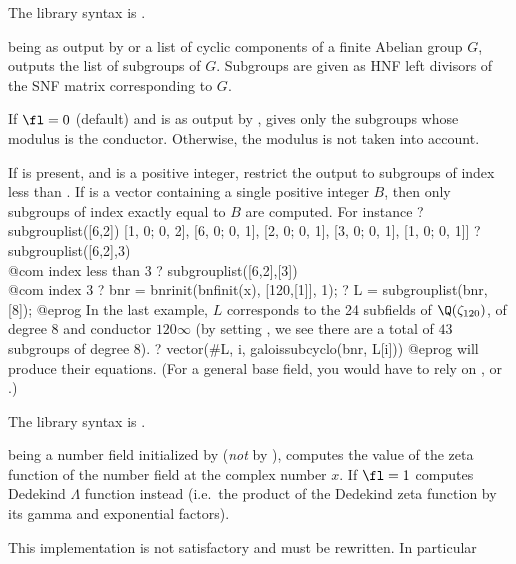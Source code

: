 The library syntax is .

\label{se:subgrouplist}
 being as output by  or a list of cyclic components
of a finite Abelian group $G$, outputs the list of subgroups of $G$. Subgroups
are given as HNF left divisors of the SNF matrix corresponding to $G$.

If $\fl=0$ (default) and  is as output by , gives
only the subgroups whose modulus is the conductor. Otherwise, the modulus is
not taken into account.

If  is present, and is a positive integer, restrict the output to
subgroups of index less than . If  is a vector
containing a single positive integer $B$, then only subgroups of index
exactly equal to $B$ are computed. For instance
\bprog
? subgrouplist([6,2])
[1, 0; 0, 2], [6, 0; 0, 1], [2, 0; 0, 1], [3, 0; 0, 1], [1, 0; 0, 1]]
? subgrouplist([6,2],3)    \\@com index less than 3
? subgrouplist([6,2],[3])  \\@com index 3
? bnr = bnrinit(bnfinit(x), [120,[1]], 1);
? L = subgrouplist(bnr, [8]);
@eprog\noindent
In the last example, $L$ corresponds to the 24 subfields of
$\Q(\zeta_{120})$, of degree $8$ and conductor $120\infty$ (by setting \fl,
we see there are a total of $43$ subgroups of degree $8$).
\bprog
? vector(#L, i, galoissubcyclo(bnr, L[i]))
@eprog\noindent
will produce their equations. (For a general base field, you would
have to rely on , or .)

The library syntax is .

\label{se:zetak}
 being a number
field initialized by  (\emph{not} by ),
computes the value of the  zeta function of the number
field at the complex number $x$. If $\fl=1$ computes Dedekind $\Lambda$
function instead (i.e.~the product of the Dedekind zeta function by its gamma
and exponential factors).

 This implementation is not satisfactory and must be
rewritten. In particular

